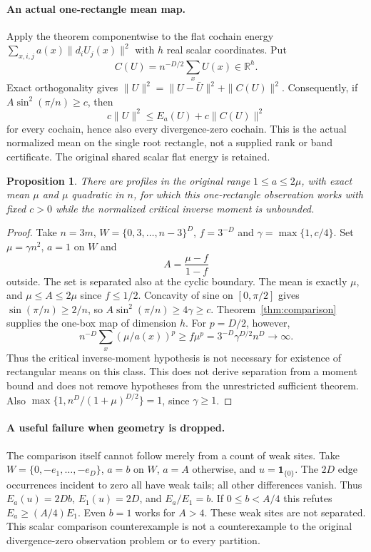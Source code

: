 \documentclass[11pt]{article}
\newtheorem{proposition}{Proposition}
\begin{document}
\paragraph{An actual one-rectangle mean map.}
Apply the theorem componentwise to the flat cochain energy $\sum_{x,i,j}a(x)\|d_iU_j(x)\|^2$ with $h$ real scalar coordinates. Put
\[
 C(U)=n^{-D/2}\sum_x U(x)\in\mathbb R^h.
\]
Exact orthogonality gives $\|U\|^2=\|U-\bar U\|^2+\|C(U)\|^2$. Consequently, if $A\sin^2(\pi/n)\ge c$, then
\[
 c\|U\|^2\le E_a(U)+c\|C(U)\|^2
\]
for every cochain, hence also every divergence-zero cochain. This is the actual normalized mean on the single root rectangle, not a supplied rank or band certificate. The original shared scalar flat energy is retained.

\begin{proposition}\label{prop:moment-notnecessary}
There are profiles in the original range $1\le a\le2\mu$, with exact mean $\mu$ and $\mu$ quadratic in $n$, for which this one-rectangle observation works with fixed $c>0$ while the normalized critical inverse moment is unbounded.
\end{proposition}
\begin{proof}
Take $n=3m$, $W=\{0,3,\ldots,n-3\}^D$, $f=3^{-D}$ and $\gamma=\max\{1,c/4\}$. Set $\mu=\gamma n^2$, $a=1$ on $W$ and
\[
 A=\frac{\mu-f}{1-f}
\]
outside. The set is separated also at the cyclic boundary. The mean is exactly $\mu$, and $\mu\le A\le2\mu$ since $f\le1/2$. Concavity of sine on $[0,\pi/2]$ gives $\sin(\pi/n)\ge2/n$, so $A\sin^2(\pi/n)\ge4\gamma\ge c$. Theorem~\ref{thm:comparison} supplies the one-box map of dimension $h$.
For $p=D/2$, however,
\[
 n^{-D}\sum_x(\mu/a(x))^p\ge f\mu^p
 =3^{-D}\gamma^{D/2}n^D\longrightarrow\infty.
\]
Thus the critical inverse-moment hypothesis is not necessary for existence of rectangular means on this class. This does not derive separation from a moment bound and does not remove hypotheses from the unrestricted sufficient theorem. Also $\max\{1,n^D/(1+\mu)^{D/2}\}=1$, since $\gamma\ge1$.
\end{proof}

\paragraph{A useful failure when geometry is dropped.}
The comparison itself cannot follow merely from a count of weak sites. Take $W=\{0,-e_1,\ldots,-e_D\}$, $a=b$ on $W$, $a=A$ otherwise, and $u=\mathbf1_{\{0\}}$. The $2D$ edge occurrences incident to zero all have weak tails; all other differences vanish. Thus $E_a(u)=2Db$, $E_1(u)=2D$, and $E_a/E_1=b$. If $0\le b<A/4$ this refutes $E_a\ge(A/4)E_1$. Even $b=1$ works for $A>4$. These weak sites are not separated. This scalar comparison counterexample is not a counterexample to the original divergence-zero observation problem or to every partition.
\end{document}
